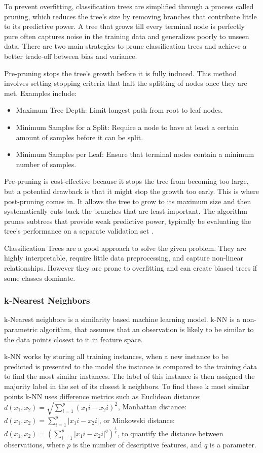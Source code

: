 \documentclass[conference]{IEEEtran}
\begin{document}
To prevent overfitting, classification trees are simplified through a process called pruning, which reduces the tree's size by removing branches that contribute little to its predictive power. A tree that grows till every terminal node is perfectly pure often captures noise in the training data and generalizes poorly to unseen data. There are two main strategies to prune classification trees and achieve a better trade-off between bias and variance.

Pre-pruning stops the tree's growth before it is fully induced. This method involves setting stopping criteria that halt the splitting of nodes once they are met. Examples include:

\begin{itemize}
    \item Maximum Tree Depth: Limit longest path from root to leaf nodes.
    \item Minimum Samples for a Split: Require a node to have at least a certain amount of samples before it can be split.
    \item Minimum Samples per Leaf: Ensure that terminal nodes contain a minimum number of samples.
\end{itemize}

Pre-pruning is cost-effective because it stops the tree from becoming too large, but a potential drawback is that it might stop the growth too early. This is where post-pruning comes in. It allows the tree to grow to its maximum size and then systematically cuts back the branches that are least important. The algorithm prunes subtrees that provide weak predictive power, typically be evaluating the tree's performance on a separate validation set \cite{b1}.

Classification Trees are a good approach to solve the given problem. They are highly interpretable, require little data preprocessing, and capture non-linear relationships. However they are prone to overfitting and can create biased trees if some classes dominate.

\subsubsection{\textbf{k-Nearest Neighbors}}

k-Nearest neighbors is a similarity based machine learning model. k-NN is a non-parametric algorithm, that assumes that an observation is likely to be similar to the data points closest to it in feature space.

k-NN works by storing all training instances, when a new instance to be predicted is presented to the model the instance is compared to the training data to find the most similar instances. The label of this instance is then assigned the majority label in the set of its closest k neighbors. To find these k most similar points k-NN uses difference metrics such as Euclidean distance: $d(x_1, x_2) = \sqrt{\sum_{i=1}^{p} (x_1i - x_2i)^2}$, Manhattan distance: $d(x_1, x_2) = \sum_{i=1}^{p} |x_1i - x_2i|$, or Minkowski distance: $d(x_1, x_2) = (\sum_{i=1}^{p} |x_1i - x_2i|^q)^\frac{1}{q}$, to quantify the distance between observations, where $p$ is the number of descriptive features, and $q$ is a parameter.
\end{document}
